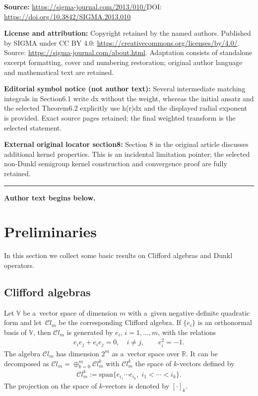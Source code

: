 \documentclass[11pt]{article}
\numberwithin{equation}{section}
\numberwithin{theorem}{section}
\numberwithin{proposition}{section}
\numberwithin{lemma}{section}
\numberwithin{corollary}{section}
\numberwithin{definition}{section}
\numberwithin{example}{section}
\numberwithin{remark}{section}
\numberwithin{note}{section}
\theoremstyle{remark}
\newcommand{\mR}{\mathbb{R}}
\newcommand{\mV}{\mathbb{V}}
\newcommand{\cC}{\mathcal{C}}
\begin{document}
\noindent\textbf{Source:} \url{https://sigma-journal.com/2013/010/}\quad DOI: \url{https://doi.org/10.3842/SIGMA.2013.010}\par
\noindent\textbf{License and attribution:} Copyright retained by the named authors. Published by SIGMA under CC BY 4.0: \url{https://creativecommons.org/licenses/by/4.0/}. Source: \url{https://sigma-journal.com/about.html}. Adaptation consists of standalone excerpt formatting, cover and numbering restoration; original author language and mathematical text are retained.\par
\noindent\textbf{Editorial symbol notice (not author text):} Several intermediate matching integrals in Section6.1 write dx without the weight, whereas the initial ansatz and the selected Theorem6.2 explicitly use h(r)dx and the displayed radial exponent is provided. Exact source pages retained; the final weighted transform is the selected statement.\par
\noindent\textbf{External original locator section8:} Section 8 in the original article discusses additional kernel properties. This is an incidental limitation pointer; the selected non-Dunkl semigroup kernel construction and convergence proof are fully retained.\par
\medskip\hrule\medskip\noindent\textbf{Author text begins below.}\par
\setcounter{section}{1}
\setcounter{subsection}{0}
\setcounter{subsubsection}{0}
\setcounter{equation}{0}
\section{Preliminaries}\label{section2}

In this section we collect some basic results on Clif\/ford algebras and Dunkl operators.

\subsection{Clif\/ford algebras}\label{section2.1}
Let $\mV$ be a~vector space of dimension $m$ with a~given negative def\/inite quadratic form and
let~$\cC l_{m}$ be the corresponding Clif\/ford algebra.
If $\{e_i\}$ is an orthonormal basis of $\mV$, then $\cC l_{m}$ is generated by $e_{i}$, $i=1,
\ldots,m$, with the relations
\begin{gather*} %
e_{i} e_{j} + e_{i} e_{j} = 0, \quad i \neq j,\qquad
 e_{i}^{2} = -1.
\end{gather*}
The algebra $\cC l_{m}$ has dimension $2^{m}$ as a~vector space over $\mR$.
It can be decomposed as $\cC l_{m}=\oplus_{k=0}^{m}\cC l_{m}^{k}$
with $\cC l_{m}^{k}$ the space of $k$-vectors def\/ined by
\begin{gather*}
\cC l_{m}^{k}:=\text{span}\{e_{i_{1}}\cdots e_{i_{k}},\; i_{1}<\cdots<i_{k}\}.
\end{gather*}
The projection on the space of $k$-vectors is denoted by $[\cdot]_{k}$.
\end{document}
